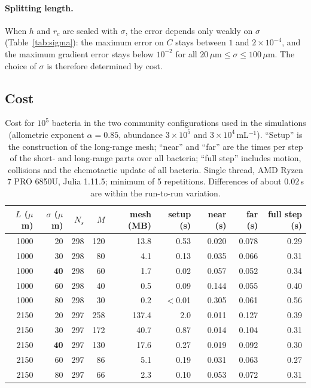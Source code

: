 \documentclass[11pt,a4paper]{article}
\newcommand{\um}{\,\mu\mathrm{m}}
\begin{document}
\paragraph{Splitting length.} When $h$ and $r_c$ are scaled with $\sigma$, the error depends only
weakly on $\sigma$ (Table~\ref{tab:sigma}): the maximum error on $C$ stays between $1$ and
$2\times10^{-4}$, and the maximum gradient error stays below $10^{-2}$ for all
$20\um \le \sigma \le 100\um$. The choice of $\sigma$ is therefore determined by cost.

\subsection{Cost}

\begin{table}[h]
  \centering\small
  \begin{tabular}{rrrrrrrrr}
    \toprule
    $L$ ($\mu$m) & $\sigma$ ($\mu$m) & $N_s$ & $M$ & mesh (MB) & setup (s) & near (s) & far (s) & full step (s) \\
    \midrule
    1000 & 20 & 298 & 120 & 13.8 & 0.53 & 0.020 & 0.078 & 0.29 \\
    1000 & 30 & 298 & 80 & 4.1 & 0.13 & 0.035 & 0.066 & 0.31 \\
    1000 & \textbf{40} & 298 & 60 & 1.7 & 0.02 & 0.057 & 0.052 & 0.34 \\
    1000 & 60 & 298 & 40 & 0.5 & 0.09 & 0.144 & 0.055 & 0.40 \\
    1000 & 80 & 298 & 30 & 0.2 & $<$0.01 & 0.305 & 0.061 & 0.56 \\
    \midrule
    2150 & 20 & 297 & 258 & 137.4 & 2.0 & 0.011 & 0.127 & 0.39 \\
    2150 & 30 & 297 & 172 & 40.7 & 0.87 & 0.014 & 0.104 & 0.31 \\
    2150 & \textbf{40} & 297 & 130 & 17.6 & 0.27 & 0.019 & 0.092 & 0.30 \\
    2150 & 60 & 297 & 86 & 5.1 & 0.19 & 0.031 & 0.063 & 0.27 \\
    2150 & 80 & 297 & 66 & 2.3 & 0.10 & 0.053 & 0.072 & 0.31 \\
    \bottomrule
  \end{tabular}
  \caption{Cost for $10^5$ bacteria in the two community configurations used in the simulations
    (allometric exponent $\alpha = 0.85$, abundance $3\times10^5$ and $3\times10^4$\,mL$^{-1}$).
    ``Setup'' is the construction of the long-range mesh; ``near'' and ``far'' are the times per
    step of the short- and long-range parts over all bacteria; ``full step'' includes motion,
    collisions and the chemotactic update of all bacteria. Single thread, AMD Ryzen 7 PRO 6850U,
    Julia 1.11.5; minimum of 5 repetitions. Differences of about $0.02$\,s are within the
    run-to-run variation.}
  \label{tab:cost}
\end{table}
\end{document}
